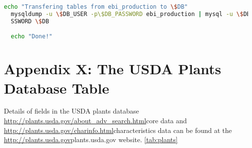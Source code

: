 \begin{enumerate}
\begin{lstlisting}[language=bash]
  echo "Transfering tables from ebi_production to \$DB"
  mysqldump -u \$DB_USER -p\$DB_PASSWORD ebi_production | mysql -u \$DB_USER -p\$DB_PA
  SSWORD \$DB

  echo "Done!"

\end{lstlisting}


\section{Appendix X: The USDA Plants Database Table}

Details of fields in the USDA plants database 
\url{http://plants.usda.gov/about_adv_search.html}{core data} and 
\url{http://plants.usda.gov/charinfo.html}{characteristics data} can be found at the 
\url{http://plants.usda.gov}{plants.usda.gov website}.
\ref{tab:plants}
 
%
% 

%
%


\end{enumerate}
